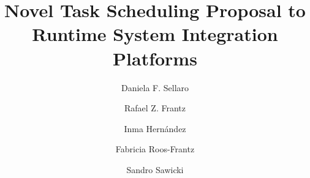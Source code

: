 \documentclass[sigconf]{acmart}
\begin{document}
	
\title{Novel Task Scheduling Proposal to Runtime System Integration Platforms}



\author{Daniela F. Sellaro}

\author{Rafael Z. Frantz}

\author{Inma Hernández}
\affiliation{%
	\institution{University of Seville}
    \state{Spain} 
}

\author{Fabricia Roos-Frantz}

\author{Sandro Sawicki}


\renewcommand{\shortauthors}{Daniela F. Sellaro et al.}
\renewcommand{\shorttitle}{Task Scheduling Optimization on EAI Platforms Based on the Meta-heuristic PSO}


\end{document}
